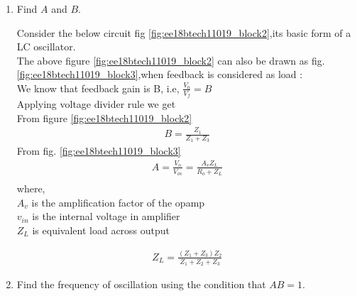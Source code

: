 \begin{enumerate}[label=\thesection.\arabic*.,ref=\thesection.\theenumi]
\item Find $A$ and $B$.

\solution Consider the below circuit fig \ref{fig:ee18btech11019_block2},its basic form of a LC oscillator.\\
%		
The above figure \ref{fig:ee18btech11019_block2} can also be drawn as fig. \ref{fig:ee18btech11019_block3},when feedback is considered as load :\\
%		
We know that feedback gain is B, i.e, $\frac{V_0}{V_f} = B$\\
Applying voltage divider rule we get\\
From figure \ref{fig:ee18btech11019_block2}
\begin{align}
    B = \frac{Z_1}{Z_1 + Z_3}
\end{align}
From fig. \eqref{fig:ee18btech11019_block3}
\begin{align}
    A = \frac{V_o}{V_{in}} = \frac{A_vZ_L}{R_o + Z_L}\\
\end{align}    
    where,\\
    $A_v$ is the amplification factor of the opamp\\
    $v_{in}$ is the internal voltage in amplifier\\
    $Z_L$ is equivalent load across output
         
\begin{align}    
    Z_L = \frac{(Z_1 + Z_3)Z_2}{Z_1+Z_2+Z_3}
\end{align}


\item Find the frequency of oscillation using the condition that $AB = 1$.


\end{enumerate}
